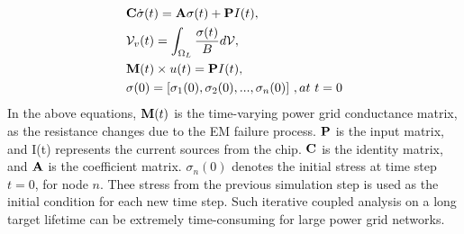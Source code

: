 \begin{align}
	\label{eq:em}
	\begin{split}
		&{\bf C} \dot{\sigma}(t)  = {\bf A} \sigma(t) + {\bf P}I(t),  \\
		&\mathcal{V}_v(t)  = \int_{\Omega_L}\frac{\sigma(t)}{B}d\mathcal{V},  \\ 
		&{\bf M}(t) \times u(t)  = {\bf P} I(t), \\
		&{\bf \sigma}(0)  = [\sigma_1(0), \sigma_2(0), ..., \sigma_n(0)] \,\, ,at \,\, t = 0 
	\end{split}
\end{align}
In the above equations, ${\bf M}(t)$ is the time-varying power grid conductance matrix, as the resistance changes due to the EM failure process. ${{\bf P}}$ is the input matrix, and I(t) represents the current sources from the chip. ${{\bf C}}$ is the identity matrix, and ${{\bf A}}$ is the coefficient matrix. $\sigma_{n}(0)$ denotes the initial stress at time step $t = 0$, for node $n$. Thee stress from the previous simulation step is used as the initial condition for each new time step. Such iterative coupled analysis on a long target lifetime can be extremely time-consuming for large power grid networks.

